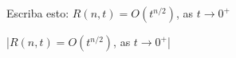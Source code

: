 

\bigskip

\enunciadoS Escriba esto: $R(n,t) = O(t^{n/2})$, as $t \to 0^+$

\bigskip

\respuestaS |$R(n,t) = O(t^{n/2})$, as $t \to 0^+$|
\bye

